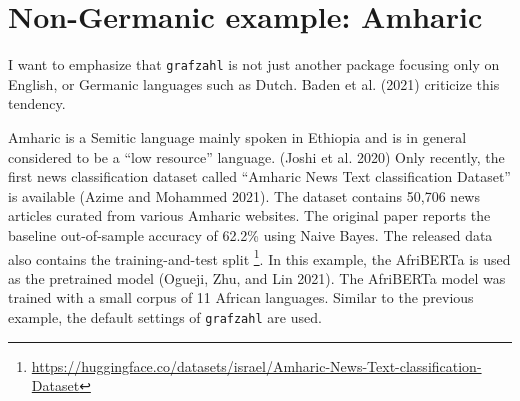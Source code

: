 \documentclass[
]{ccr}
\newenvironment{Shaded}{\begin{snugshade}}{\end{snugshade}}
\newcommand{\AttributeTok}[1]{\textcolor[rgb]{0.40,0.45,0.13}{#1}}
\newcommand{\DocumentationTok}[1]{\textcolor[rgb]{0.37,0.37,0.37}{\textit{#1}}}
\newcommand{\FunctionTok}[1]{\textcolor[rgb]{0.28,0.35,0.67}{#1}}
\newcommand{\NormalTok}[1]{\textcolor[rgb]{0.00,0.23,0.31}{#1}}
\newcommand{\OtherTok}[1]{\textcolor[rgb]{0.00,0.23,0.31}{#1}}
\newcommand{\SpecialCharTok}[1]{\textcolor[rgb]{0.37,0.37,0.37}{#1}}
\newcommand{\StringTok}[1]{\textcolor[rgb]{0.13,0.47,0.30}{#1}}
\begin{document}
\hypertarget{non-germanic-example-amharic}{%
\section{Non-Germanic example:
Amharic}\label{non-germanic-example-amharic}}

I want to emphasize that \texttt{grafzahl} is not just another package
focusing only on English, or Germanic languages such as Dutch. Baden et
al. (2021) criticize this tendency.

Amharic is a Semitic language mainly spoken in Ethiopia and is in
general considered to be a ``low resource'' language. (Joshi et al.
2020) Only recently, the first news classification dataset called
``Amharic News Text classification Dataset'' is available (Azime and
Mohammed 2021). The dataset contains 50,706 news articles curated from
various Amharic websites. The original paper reports the baseline
out-of-sample accuracy of 62.2\% using Naive Bayes. The released data
also contains the training-and-test split \footnote{\url{https://huggingface.co/datasets/israel/Amharic-News-Text-classification-Dataset}}.
In this example, the AfriBERTa is used as the pretrained model (Ogueji,
Zhu, and Lin 2021). The AfriBERTa model was trained with a small corpus
of 11 African languages. Similar to the previous example, the default
settings of \texttt{grafzahl} are used.

\begin{Shaded}
\end{Shaded}
\end{document}
